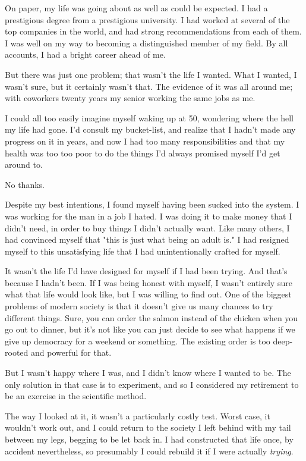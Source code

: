 \documentclass[]{book}
\begin{document}
On paper, my life was going about as well as could be expected. I had a
prestigious degree from a prestigious university. I had worked at several of the
top companies in the world, and had strong recommendations from each of them. I
was well on my way to becoming a distinguished member of my field. By all
accounts, I had a bright career ahead of me.

But there was just one problem; that wasn't the life I wanted. What I wanted, I
wasn't sure, but it certainly wasn't that. The evidence of it was all around me;
with coworkers twenty years my senior working the same jobs as me.

I could all too easily imagine myself waking up at 50, wondering where the hell
my life had gone. I'd consult my bucket-list, and realize that I hadn't made any
progress on it in years, and now I had too many responsibilities and that my
health was too too poor to do the things I'd always promised myself I'd get
around to.

No thanks.

Despite my best intentions, I found myself having been sucked into the system. I
was working for the man in a job I hated. I was doing it to make money that I
didn't need, in order to buy things I didn't actually want. Like many others, I
had convinced myself that "this is just what being an adult is." I had resigned
myself to this unsatisfying life that I had unintentionally crafted for myself.

It wasn't the life I'd have designed for myself if I had been trying. And that's
because I hadn't been. If I was being honest with myself, I wasn't entirely sure
what that life would look like, but I was willing to find out. One of the
biggest problems of modern society is that it doesn't give us many chances to
try different things. Sure, you can order the salmon instead of the chicken when
you go out to dinner, but it's not like you can just decide to see what happens
if we give up democracy for a weekend or something. The existing order is too
deep-rooted and powerful for that.

But I wasn't happy where I was, and I didn't know where I wanted to be. The only
solution in that case is to experiment, and so I considered my retirement to be
an exercise in the scientific method.

The way I looked at it, it wasn't a particularly costly test. Worst case, it
wouldn't work out, and I could return to the society I left behind with my tail
between my legs, begging to be let back in. I had constructed that life once, by
accident nevertheless, so presumably I could rebuild it if I were actually
\emph{trying}.
\end{document}
